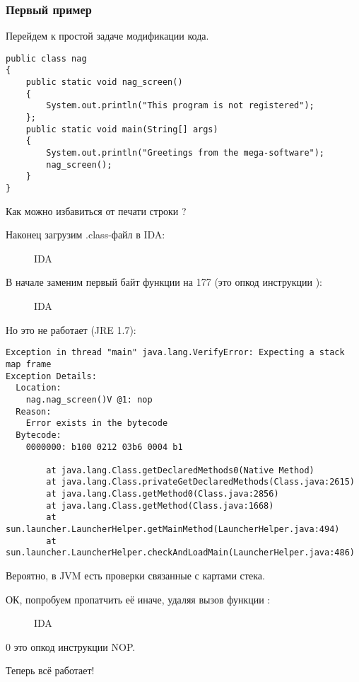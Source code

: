 \subsubsection{Первый пример}


Перейдем к простой задаче модификации кода.

\begin{lstlisting}[style=customjava]
public class nag
{
	public static void nag_screen()
	{
		System.out.println("This program is not registered");
	};
	public static void main(String[] args) 
	{
		System.out.println("Greetings from the mega-software");
		nag_screen();
	}
}
\end{lstlisting}


Как можно избавиться от печати строки ?


Наконец загрузим .class-файл в IDA:

\begin{figure}[H]
\centering
{}
\caption{IDA}
\end{figure}


В начале заменим первый байт функции на 177 (это опкод инструкции ):

\begin{figure}[H]
\centering
{}
\caption{IDA}
\end{figure}

Но это не работает (JRE 1.7):

\begin{lstlisting}
Exception in thread "main" java.lang.VerifyError: Expecting a stack map frame
Exception Details:
  Location:
    nag.nag_screen()V @1: nop
  Reason:
    Error exists in the bytecode
  Bytecode:
    0000000: b100 0212 03b6 0004 b1

        at java.lang.Class.getDeclaredMethods0(Native Method)
        at java.lang.Class.privateGetDeclaredMethods(Class.java:2615)
        at java.lang.Class.getMethod0(Class.java:2856)
        at java.lang.Class.getMethod(Class.java:1668)
        at sun.launcher.LauncherHelper.getMainMethod(LauncherHelper.java:494)
        at sun.launcher.LauncherHelper.checkAndLoadMain(LauncherHelper.java:486)
\end{lstlisting}

%
Вероятно, в JVM есть проверки связанные с картами стека.


ОК, попробуем пропатчить её иначе, удаляя вызов функции :

\begin{figure}[H]
\centering
{}
\caption{IDA}
\end{figure}


0 это опкод инструкции \ac{NOP}.

Теперь всё работает!
